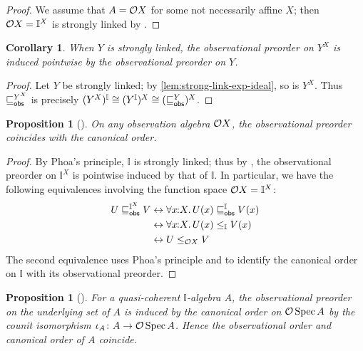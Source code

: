 \documentclass[a4paper,12pt]{amsart}
\newtheorem{corollary}[theorem]{Corollary}
\newtheorem{proposition}[theorem]{Proposition}
\theoremstyle{definition}
\newcommand{\mbb}[1]{\mathbb{#1}}
\newcommand{\I}{\mbb I}
\newcommand{\fa}[2]{\forall #1\!\colon\!\!#2\mathpunct{.}}
\newcommand{\eq}{\leftrightarrow}
\newcommand{\spec}{\operatorname{Spec}}
\begin{document}
\begin{proof}
  We assume that $A=\mathcal{O}{X}$ for some not necessarily affine $X$; then $\opens{X}=\I^X$ is strongly linked by .
\end{proof}


\begin{corollary}\label{cor:strong-link-obs-pw}
  When $Y$ is strongly linked, the observational preorder on $Y^X$ is induced pointwise by the observational preorder on $Y$.
\end{corollary}

\begin{proof}
  Let $Y$ be strongly linked; by \cref{lem:strong-link-exp-ideal}, so is $Y^X$. Thus $\obsle[Y^X]$ is precisely $(Y^X)^\I\cong (Y^\I)^X\cong (\obsle[Y])^X$.
\end{proof}

\begin{proposition}[\AxiomSQCP]\label{prop:specordopens}
  On any observation algebra $\mathcal{O}{X}$, the observational preorder coincides with the canonical order.
\end{proposition}

\begin{proof}
  By Phoa's principle, $\I$ is strongly linked; thus by , the observational preorder on $\I^X$ is pointwise induced by that of $\I$. In particular, we have the following equivalences involving the function space $\opens{X}=\I^X$:
  \begin{align*}
    U\obsle[\I^X]V 
    &\eq \fa{x}{X} U(x)\obsle[\I] V(x)
    \\
    &\eq \fa{x}{X} U(x)\le_{\I} V(x)
    \\
    &\eq U\le_{\opens{X}} V \qedhere
  \end{align*}
  The second equivalence uses Phoa's principle and  to identify the canonical order on $\I$ with its observational preorder.
% 
\end{proof}

\begin{proposition}[\AxiomSQCP]\label{cor:specordonalgiscan}
  For a quasi-coherent $\I$-algebra $A$, the observational preorder on the underlying set of $A$ is induced by the canonical order on $\opens\spec{A}$ by the counit isomorphism $\iota_A\colon A\to \opens\spec{A}$. Hence the observational order and canonical order of $A$ coincide.
\end{proposition}
\end{document}
